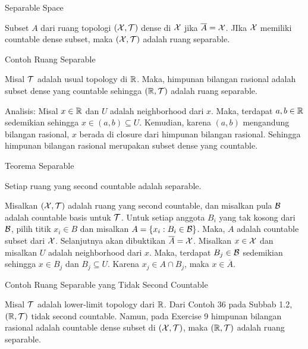 \begin{frame}{Separable Space}
    \begin{tcolorbox}[enhanced,title=Definisi, frame style tile={width=\paperwidth}{\wallpaper}]
    Subset $A$ dari ruang topologi $(\mathcal{X},\mathcal{T})$ dense di $\mathcal{X}$ jika $\overline{A} = \mathcal{X}$. JIka $\mathcal{X}$ memiliki countable dense subset, maka $(\mathcal{X}, \mathcal{T})$ adalah ruang separable.
    \end{tcolorbox}
\end{frame}

\begin{frame}{Contoh Ruang Separable}
    \begin{tcolorbox}[enhanced,title=Contoh 44, frame style tile={width=\paperwidth}{\wallpaper}]
    Misal $\mathcal{T}$ adalah usual topology di $\mathbb{R}$. Maka, himpunan bilangan rasional adalah subset dense yang countable sehingga $(\mathbb{R}, \mathcal{T})$ adalah ruang separable.
    \end{tcolorbox}
    Analisis: Misal $x\in \mathbb{R}$ dan $U$ adalah neighborhood dari $x$. Maka, terdapat $a,b\in\mathbb{R}$ sedemikian sehingga $x\in(a,b)\subseteq U$. Kemudian, karena $(a,b)$ mengandung bilangan rasional, $x$ berada di closure dari himpunan bilangan rasional. Sehingga himpunan bilangan rasional merupakan subset dense yang countable.
\end{frame}

\begin{frame}{Teorema Separable}
    \begin{tcolorbox}[enhanced,title=Teorema 1.23, frame style tile={width=\paperwidth}{\wallpaper}]
    Setiap ruang yang second countable adalah separable.
    \end{tcolorbox}
    \begin{tcolorbox}[enhanced,title=Teorema 1.23 (Bukti), frame style tile={width=\paperwidth}{\wallpaper}]
    Misalkan $(\mathcal{X},\mathcal{T})$ adalah ruang yang second countable, dan misalkan pula $\mathcal{B}$ adalah countable basis untuk $\mathcal{T}$. Untuk setiap anggota $B_i$ yang tak kosong dari $\mathcal{B}$, pilih titik $x_i\in B$ dan misalkan $A = \{x_i: B_i\in \mathcal{B}\}$. Maka, $A$ adalah countable subset dari $\mathcal{X}$. Selanjutnya akan dibuktikan $\overline{A} = \mathcal{X}$. Misalkan $x\in \mathcal{X}$ dan misalkan $U$ adalah neighborhood dari $x$. Maka, terdapat $B_j\in \mathcal{B}$ sedemikian sehingga $x\in B_j$ dan $B_j\subseteq U$. Karena $x_j\in A\cap B_j$, maka $x\in \overline{A}$.
    \end{tcolorbox}
\end{frame}

\begin{frame}{Contoh Ruang Separable yang Tidak Second Countable}
\begin{tcolorbox}[enhanced,title=Contoh 45, frame style tile={width=\paperwidth}{\wallpaper}]
Misal $\mathcal{T}$ adalah lower-limit topology dari $\mathbb{R}$.  Dari Contoh 36 pada Subbab 1.2, $(\mathbb{R},\mathcal{T})$ tidak second countable. Namun, pada Exercise 9 himpunan bilangan rasional adalah countable dense subset di $(\mathcal{X},\mathcal{T})$, maka $(\mathbb{R},\mathcal{T})$ adalah ruang separable.
\end{tcolorbox}

\end{frame}

